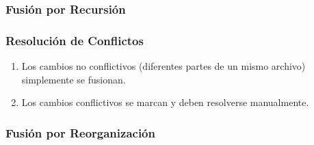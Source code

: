 \documentclass[animated,a4paper,slidestop,xcolor=pst,blue]{beamer}
\begin{document}
\begin{frame}[t]
	\frametitle{Fusión por Recursión}
\end{frame}

\begin{frame}[c]
    \frametitle{Resolución de Conflictos}
    \begin{enumerate}[<+->]
        \item Los cambios no conflictivos (diferentes partes de un mismo archivo) simplemente se fusionan.
        \item Los cambios conflictivos se marcan y deben resolverse manualmente.
    \end{enumerate}
\end{frame}

\begin{frame}[t]
	\frametitle{Fusión por Reorganización}
\end{frame}
\end{document}
